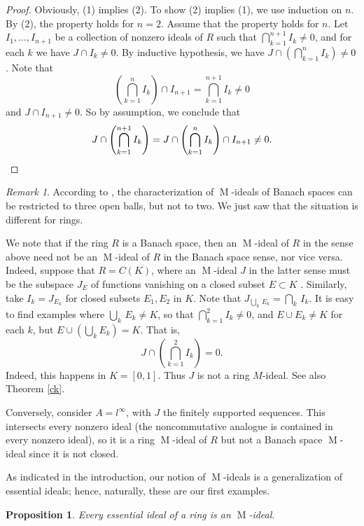 \documentclass[11pt,leqno]{amsart}
\DeclareMathOperator{\m}{M}
\newtheorem{proposition}[theorem]{Proposition}
\theoremstyle{definition}
\theoremstyle{remark}
\newtheorem{remark}[theorem]{Remark}
\numberwithin{equation}{section}
\numberwithin{equation}{section}
\begin{document}
\begin{proof}
Obviously, (1) implies (2). To show (2) implies (1), we use induction on $n$. By (2), the property holds for $n=2$. Assume that the property holds for $n$. Let $I_1,\ldots,I_{n+1}$ be a collection of nonzero ideals of $R$ such that $ \bigcap_{k=1}^{n+1} I_k \neq 0$, and for each $k$ we have $J\cap I_k\neq 0$. By inductive hypothesis, we have $J\cap (\bigcap_{k=1}^{n} I_k ) \neq 0$. Note that \[\left(\bigcap_{k=1}^{n} I_k\right) \cap I_{n+1}= \bigcap_{k=1}^{n+1} I_k \neq 0\]  and $J \cap I_{n+1} \neq 0$. So by assumption, we conclude that \[J \cap \left(\bigcap_{k=1}^{n+1} I_k \right)= J \cap\left(\bigcap_{k=1}^{n} I_k\right) \cap I_{n+1}\neq 0.\qedhere\]
\end{proof}

\begin{remark}  \label{cke} According to \cite[Theorem 5.9]{AE72}, the characterization of $\m$-ideals of Banach spaces can be restricted to three open balls, but not to two. We just saw that the situation is different for rings.


We note that if the ring $R$ is a Banach space, then an \(\m\)-ideal of  $R$
in the sense above need not be an \(\m\)-ideal of  $R$ in the Banach space sense, nor vice versa.  Indeed, suppose that $R = C(K)$, where an $\m$-ideal
$J$ in the latter sense must be the subspace $J_E$ of functions vanishing on a closed subset  $E \subset K$ \cite{HWW93}.  Similarly, take $I_k = J_{E_k}$ for  closed subsets $E_1, E_2$ in $K$.   Note that $J_{\bigcup_k \, E_k} = 
\bigcap_k \, I_k$.  
It is easy to find examples where 
$\bigcup_k \, E_k \neq K$, so that $\bigcap_{k=1}^2 I_k\neq 0$, and $E \cup E_k \neq K$ for each $k$, but $E \cup (\bigcup_k  E_k) = K$. That is, \[J \cap \left(\bigcap_{k=1}^2 I_k\right) = 0.\]
Indeed, this happens in $K = [0,1]$.  Thus $J$ is not a ring $M$-ideal. 
See also Theorem \ref{ck}.

Conversely, consider $A = l^\infty$, with $J$ the finitely supported sequences.   This intersects every nonzero ideal (the noncommutative analogue is contained in every 
nonzero ideal), so it is a ring $\m$-ideal of  $R$
but not a Banach space $\m$-ideal since it is not closed.
\end{remark}

As indicated in the introduction, our notion of 
$\m$-ideals  is a generalization of essential ideals; hence, naturally, these are our first examples.

\begin{proposition}\label{eim}
Every essential ideal of a ring is an \( \m \)-ideal.
\end{proposition}
\end{document}
